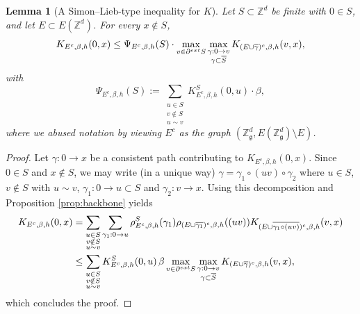 \documentclass[10pt,a4paper]{amsart}
\numberwithin{equation}{section}
\newtheorem{Lem}[Thm]{Lemma}
\newcommand\fg{\mathfrak{g}}
\begin{document}
\begin{Lem}[A Simon--Lieb-type inequality for $K$]\label{lem: SL for K} Let $S\subset \mathbb Z^d$ be finite with $0\in S$, and let $E\subset E(\mathbb Z^d)$. For every $x\notin S$,
\begin{equation}
	K_{E^c,\beta,h}(0,x)\leq \Psi_{E^c,\beta,h}(S)\cdot \max_{v\in \partial^{\textup{ext}}S}\max_{\substack{\gamma:0\rightarrow v\\\gamma\subset\overline{S}}}K_{(E\cup\overline{\gamma})^c,\beta,h}(v,x),
\end{equation}
with \begin{equation}
	\Psi_{E^c,\beta,h}(S):=\sum_{\substack{u\in S\\v\notin S\\u\sim v}}K_{E^c,\beta,h}^S(0,u)\cdot \beta,
\end{equation}
where we abused notation by viewing $E^c$ as the graph $(\mathbb Z^d_\fg,E(\mathbb Z^d_\fg)\setminus E)$. 
\end{Lem}
\begin{proof} Let $\gamma:0\rightarrow x$ be a consistent path contributing to $K_{E^c,\beta,h}(0,x)$. Since $0\in S$ and $x\notin S$, we may write (in a unique way) $\gamma=\gamma_1\circ(uv)\circ\gamma_2$ where $u\in S$, $v\notin S$ with $u\sim v$, $\gamma_1:0\rightarrow u\subset S$ and $\gamma_2:v\rightarrow x$. Using this decomposition and Proposition \ref{prop:backbone} yields
\begin{align}
\begin{aligned}
	K_{E^c,\beta,h}(0,x)&=\sum_{\substack{u\in S\\v\notin S\\ u\sim v}}\sum_{\gamma_1:0\rightarrow u}\rho_{E^c,\beta,h}^S(\gamma_1)\rho_{(E\cup \overline{\gamma_1})^c,\beta,h}((uv))K_{(E\cup \overline{\gamma_1\circ (uv)})^c,\beta,h}(v,x)
	\\&\leq \sum_{\substack{u\in S\\v\notin S\\u\sim v}}K_{E^c,\beta,h}^S(0,u)\, \beta  \max_{v\in \partial^{\textup{ext}}S}\max_{\substack{\gamma:0\rightarrow v\\\gamma\subset \overline{S}}}K_{(E\cup\overline{\gamma})^c,\beta,h}(v,x),
	\end{aligned}
\end{align}
		which concludes the proof.
\end{proof}
\end{document}
